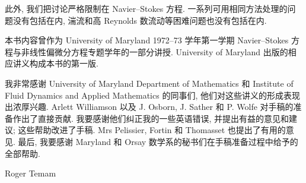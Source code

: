 此外, 我们把讨论严格限制在 Navier--Stokes 方程. 一系列可用相同方法处理的问题没有包括在内, 湍流和高 Reynolds 数流动等困难问题也没有包括在内.

本书内容曾作为 University of Maryland 1972--73 学年第一学期 Navier--Stokes 方程与非线性偏微分方程专题学年的一部分讲授. University of Maryland 出版的相应讲义构成本书的第一版.

我非常感谢 University of Maryland Department of Mathematics 和 Institute of Fluid Dynamics and Applied Mathematics 的同事们, 他们对这些讲义的形成表现出浓厚兴趣. Arlett Williamson 以及 J. Osborn, J. Sather 和 P. Wolfe 对手稿的准备作出了直接贡献. 我要感谢他们纠正我的一些英语错误, 并提出有益的意见和建议; 这些帮助改进了手稿. Mrs Pelissier, Fortin 和 Thomasset 也提出了有用的意见. 最后, 我要感谢 Maryland 和 Orsay 数学系的秘书们在手稿准备过程中给予的全部帮助.

\begin{flushright}
Roger Temam
\end{flushright}

\clearpage
{}
